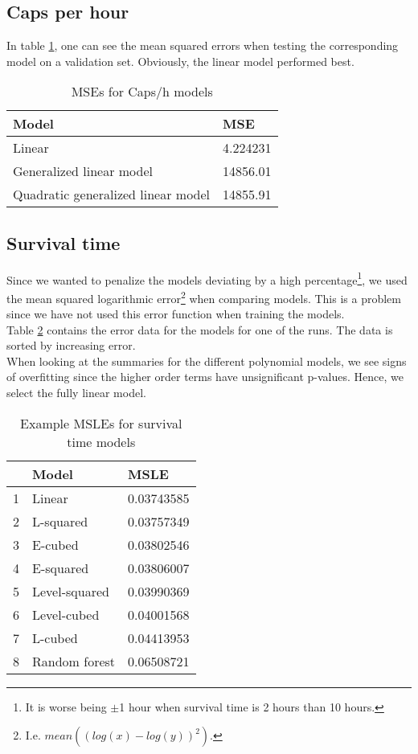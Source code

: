 \subsection{Caps per hour}
In table \ref{table:MSE.caps}, one can see the mean squared errors when testing the corresponding model on a validation set. Obviously, the linear model performed best.
\begin{table}
\caption{MSEs for Caps/h models}
\label{table:MSE.caps}
\centering
\begin{tabular}{l|l}
\hline
\textbf{Model}&\textbf{MSE}\\
\hline
Linear&4.224231\\
Generalized linear model&14856.01\\
Quadratic generalized linear model&14855.91\\
\hline
\end{tabular}
\end{table}


\subsection{Survival time}
Since we wanted to penalize the models deviating by a high percentage\footnote{It is worse being $\pm$1 hour when survival time is 2 hours than 10 hours.}, we used the mean squared logarithmic error\footnote{I.e. $mean((log(x)-log(y))^2)$.} when comparing models. This is a problem since we have not used this error function when training the models.\\

Table \ref{table:MSLE.survival} contains the error data for the models for one of the runs. The data is sorted by increasing error.\\

When looking at the summaries for the different polynomial models, we see signs of overfitting since the higher order terms have unsignificant p-values. Hence, we select the fully linear model.
\begin{table}
\caption{Example MSLEs for survival time models}
\label{table:MSLE.survival}
\centering
\begin{tabular}{l l|l}
\hline
&\textbf{Model}&\textbf{MSLE}\\\hline
1 & Linear & 0.03743585 \\
2 & L-squared & 0.03757349 \\
3 & E-cubed & 0.03802546 \\
4 & E-squared & 0.03806007 \\
5 & Level-squared & 0.03990369 \\
6 & Level-cubed & 0.04001568 \\
7 & L-cubed & 0.04413953 \\
8 & Random forest & 0.06508721 \\
\hline
\end{tabular}
\end{table}